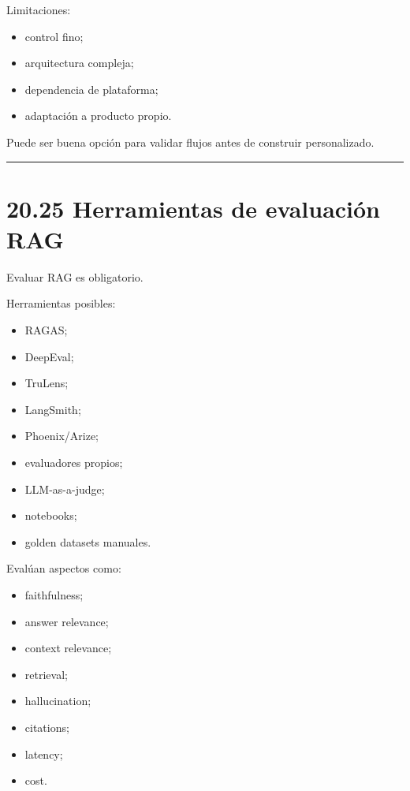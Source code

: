 Limitaciones:

\begin{itemize}
\tightlist
\item
  control fino;
\item
  arquitectura compleja;
\item
  dependencia de plataforma;
\item
  adaptación a producto propio.
\end{itemize}

Puede ser buena opción para validar flujos antes de construir
personalizado.

\begin{center}\rule{0.5\linewidth}{0.5pt}\end{center}

\section{20.25 Herramientas de evaluación
RAG}\label{herramientas-de-evaluaciuxf3n-rag}

Evaluar RAG es obligatorio.

Herramientas posibles:

\begin{itemize}
\tightlist
\item
  RAGAS;
\item
  DeepEval;
\item
  TruLens;
\item
  LangSmith;
\item
  Phoenix/Arize;
\item
  evaluadores propios;
\item
  LLM-as-a-judge;
\item
  notebooks;
\item
  golden datasets manuales.
\end{itemize}

Evalúan aspectos como:

\begin{itemize}
\tightlist
\item
  faithfulness;
\item
  answer relevance;
\item
  context relevance;
\item
  retrieval;
\item
  hallucination;
\item
  citations;
\item
  latency;
\item
  cost.
\end{itemize}

